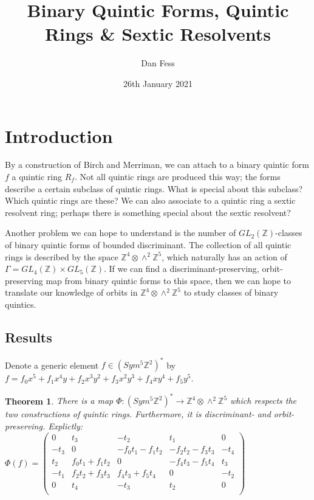 \documentclass{article}
\begin{document}
\title{Binary Quintic Forms, Quintic Rings \& Sextic Resolvents}
\author{Dan Fess}
\date{26th January 2021}
\maketitle

\newtheorem{theorem}{Theorem}
\newtheorem{lemma}{Lemma}[section]
\newtheorem{prop}[lemma]{Proposition}
\newtheorem{corollary}[lemma]{Corollary}
\newtheorem{conjecture}{Conjecture}

\section{Introduction}

By a construction of Birch and Merriman, we can attach to a binary quintic form $f$ a quintic ring $R_f$.  Not all quintic rings are produced this way; the forms describe a certain subclass of quintic rings.  What is special about this subclass?  Which quintic rings are these?  We can also associate to a quintic ring a sextic resolvent ring; perhaps there is something special about the sextic resolvent?

Another problem we can hope to understand is the number of $GL_2(\mathbb{Z})$-classes of binary quintic forms of bounded discriminant.  The collection of all quintic rings is described by the space $\mathbb{Z}^4 \otimes \wedge^2 \mathbb{Z}^5$, which naturally has an action of $\Gamma = GL_4(\mathbb{Z}) \times GL_5(\mathbb{Z})$.  If we can find a discriminant-preserving, orbit-preserving map from binary quintic forms to this space, then we can hope to translate our knowledge of orbits in $\mathbb{Z}^4 \otimes \wedge^2 \mathbb{Z}^5$ to study classes of binary quintics.

\subsection{Results}

Denote a generic element $f \in (Sym^5 \mathbb{Z}^2)^*$ by $f = f_0 x^5 + f_1 x^4 y + f_2 x^3 y^2 + f_3 x^2 y^3 + f_4 x y^4 + f_5 y^5$.

\begin{theorem}
There is a map $\Phi : (Sym^5 \mathbb{Z}^2)^* \to \mathbb{Z}^4 \otimes \wedge^2 \mathbb{Z}^5$ which respects the two constructions of quintic rings.  Furthermore, it is discriminant- and orbit-preserving.  Explictly:\\

$\Phi(f) = \begin{pmatrix}
0 & t_3 & - t_2 & t_1 & 0\\
- t_3 & 0 & -  f_0 t_1 -  f_1 t_2 & -  f_2 t_2 -  f_3 t_3 & - t_4\\
t_2 &  f_0 t_1 +  f_1 t_2 & 0 & -  f_4 t_3 -  f_5 t_4 & t_3\\
- t_1 &  f_2 t_2 +  f_3 t_3 &  f_4 t_3 +  f_5 t_4 & 0 & - t_2\\
0 & t_4 & - t_3 & t_2 & 0\\
\end{pmatrix}$\\
\end{theorem}
\end{document}
